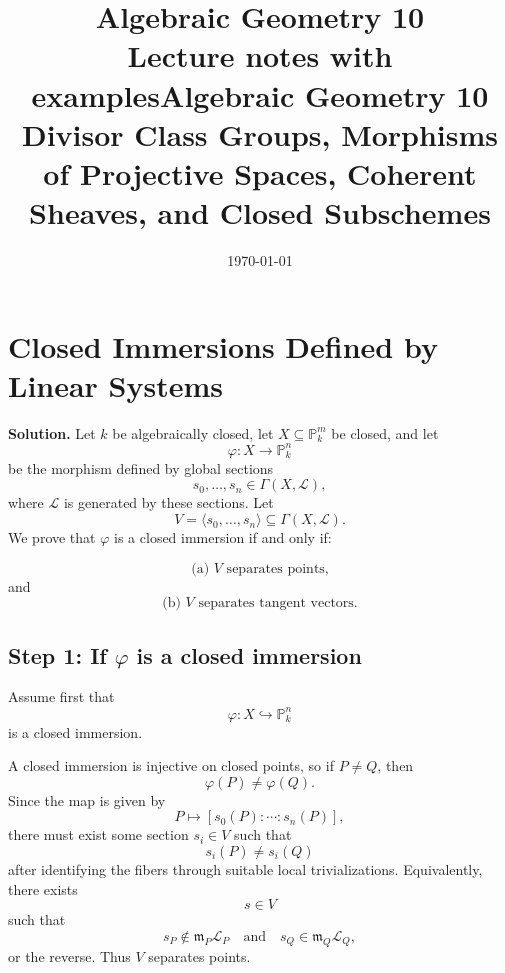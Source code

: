 \documentclass[12pt,a4paper]{article}
\title{\bfseries Algebraic Geometry 10\\


\large Lecture notes with examples}
\author{}
\date{\today}
\theoremstyle{notespace}
\begin{document}
\maketitle
\tableofcontents
\clearpage



\title{Algebraic Geometry 10\\
	\large Divisor Class Groups, Morphisms of Projective Spaces, Coherent Sheaves, and Closed Subschemes}
\author{}
\date{}
\maketitle

\tableofcontents

\newpage

\setcounter{section}{0}

\section{Closed Immersions Defined by Linear Systems}

\textbf{Solution.}
Let \(k\) be algebraically closed, let \(X\subseteq \mathbb P^m_k\) be closed, and let
\[
\varphi:X\longrightarrow \mathbb P^n_k
\]
be the morphism defined by global sections
\[
s_0,\dots,s_n\in \Gamma(X,\mathcal L),
\]
where \(\mathcal L\) is generated by these sections. Let
\[
V=\langle s_0,\dots,s_n\rangle \subseteq \Gamma(X,\mathcal L).
\]
We prove that \(\varphi\) is a closed immersion if and only if:

\[
\text{(a) } V \text{ separates points,}
\]
and
\[
\text{(b) } V \text{ separates tangent vectors.}
\]

\subsection*{Step 1: If \(\varphi\) is a closed immersion}

Assume first that
\[
\varphi:X\hookrightarrow \mathbb P^n_k
\]
is a closed immersion.

A closed immersion is injective on closed points, so if \(P\neq Q\), then
\[
\varphi(P)\neq \varphi(Q).
\]
Since the map is given by
\[
P\mapsto [s_0(P):\cdots:s_n(P)],
\]
there must exist some section \(s_i\in V\) such that
\[
s_i(P)\neq s_i(Q)
\]
after identifying the fibers through suitable local trivializations. Equivalently, there exists
\[
s\in V
\]
such that
\[
s_P\notin \mathfrak m_P\mathcal L_P
\quad\text{and}\quad
s_Q\in \mathfrak m_Q\mathcal L_Q,
\]
or the reverse. Thus \(V\) separates points.
\end{document}
